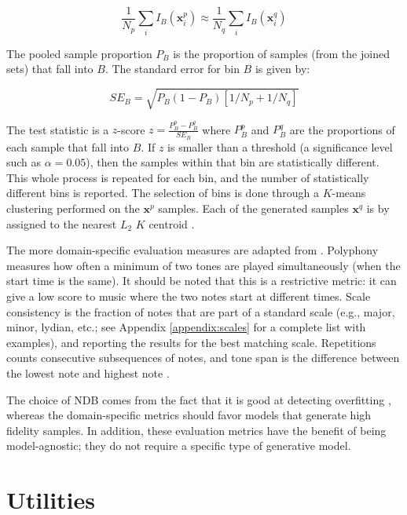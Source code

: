 \documentclass[a4paper]{book}
\begin{document}
\begin{equation}
    \frac{1}{N_p} \sum_i I_B(\mathbf{x}_i^p) \approx \frac{1}{N_q} \sum_i I_B(\mathbf{x}_i^q)
\end{equation}

The pooled sample proportion $P_B$ is the proportion of samples (from the joined sets) that fall into $B$. The standard error for bin $B$ is given by:

\begin{equation}
    SE_B = \sqrt{P_B (1 - P_B)[1 / N_p + 1 / N_q]}
\end{equation}

The test statistic is a $z$-score $z = \frac{P_B^p - P_B^q}{SE_B}$ where $P_B^p$ and $P_B^q$ are the proportions of each sample that fall into $B$. If $z$ is smaller than a threshold (a significance level such as $\alpha = 0.05$), then the samples within that bin are statistically different. This whole process is repeated for each bin, and the number of statistically different bins is reported. The selection of bins is done through a $K$-means clustering performed on the $\mathbf{x}^p$ samples. Each of the generated samples $\mathbf{x}^q$ is by assigned to the nearest $L_2$ $K$ centroid \parencite{richardson_gans_2018}.

The more domain-specific evaluation measures are adapted from \textcite{mogren_c-rnn-gan_2016}. Polyphony measures how often a minimum of two tones are played simultaneously (when the start time is the same). It should be noted that this is a restrictive metric: it can give a low score to music where the two notes start at different times. Scale consistency is the fraction of notes that are part of a standard scale (e.g., major, minor, lydian, etc.; see Appendix \ref{appendix:scales} for a complete list with examples), and reporting the results for the best matching scale. Repetitions counts consecutive subsequences of notes, and tone span is the difference between the lowest note and highest note \parencite[counted in semi-tones;][]{mogren_c-rnn-gan_2016}.

The choice of NDB comes from the fact that it is good at detecting overfitting \parencite{borji_pros_2018}, whereas the domain-specific metrics should favor models that generate high fidelity samples. In addition, these evaluation metrics have the benefit of being model-agnostic; they do not require a specific type of generative model.

\section{Utilities}
\end{document}
